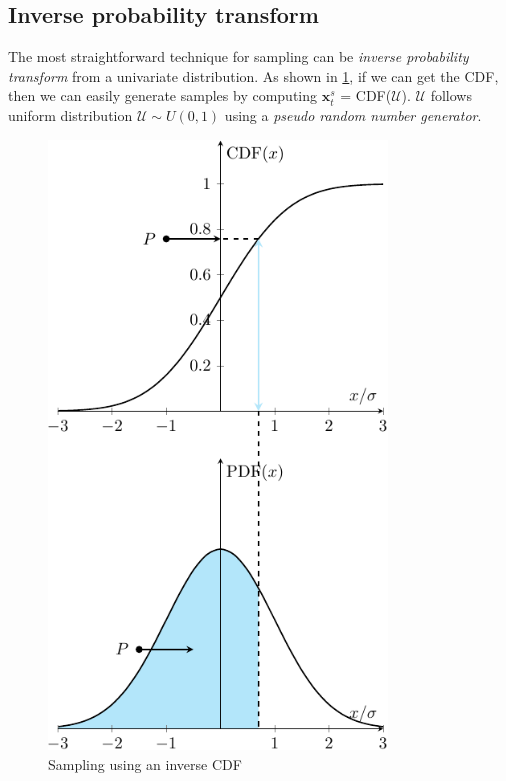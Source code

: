 \subsection{Inverse probability transform}
The most straightforward technique for sampling can be \textit{inverse probability transform} from a univariate distribution. As shown in \cref{fig: CDF}, if we can get the \acrfull{CDF}, then we can easily generate samples by computing $\boldsymbol{x}_{t}^{s}$ = CDF($\mathcal{U}$). $\mathcal{U}$ follows uniform distribution $\mathcal{U} \sim U(0,1)$ using a \textit{pseudo random number generator}.
\begin{figure}[H]
    \centering
    \includegraphics[width = 90mm]{Figures/figure-CDF.pdf}
    \caption{Sampling using an inverse CDF}
    \label{fig: CDF}
\end{figure}

